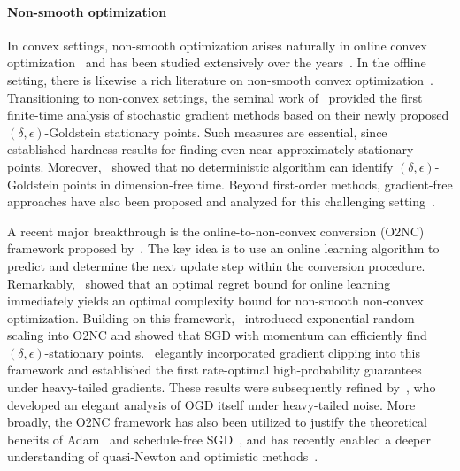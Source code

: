 \documentclass{article}
\begin{document}
\paragraph{Non-smooth optimization}
In convex settings, non-smooth optimization arises naturally in online convex optimization~\citep{zinkevich2003oco} and has been studied extensively over the years~\citep{hazan2019introduction,orabona2019intro}. In the offline setting, there is likewise a rich literature on non-smooth convex optimization~\citep{bubeck2015convex,hazan2019lecture}. Transitioning to non-convex settings, the seminal work of~\citet{zhang2020complexity} provided the first finite-time analysis of stochastic gradient methods based on their newly proposed $(\delta,\epsilon)$-Goldstein stationary points. Such measures are essential, since~\citet{kornowski2022oracle} established hardness results for finding even near approximately-stationary points. Moreover,~\citet{jordan2023deterministic} showed that no deterministic algorithm can identify $(\delta,\epsilon)$-Goldstein points in dimension-free time. Beyond first-order methods, gradient-free approaches have also been proposed and analyzed for this challenging setting~\citep{lin2022gradient,chen2023faster,liu2024zeroth,liu2024gradient}.

A recent major breakthrough is the online-to-non-convex conversion (O2NC) framework proposed by~\citet{cutkosky2023optimal}. The key idea is to use an online learning algorithm to predict and determine the next update step within the conversion procedure. Remarkably,~\citet{cutkosky2023optimal} showed that an optimal regret bound for online learning immediately yields an optimal complexity bound for non-smooth non-convex optimization. Building on this framework,~\citet{zhang2024random} introduced exponential random scaling into O2NC and showed that SGD with momentum can efficiently find $(\delta,\epsilon)$-stationary points.~\citet{ICML:2024:Liu} elegantly incorporated gradient clipping into this framework and established the first rate-optimal high-probability guarantees under heavy-tailed gradients. These results were subsequently refined by~\citet{liu2026old}, who developed an elegant analysis of OGD itself under heavy-tailed noise. More broadly, the O2NC framework has also been utilized to justify the theoretical benefits of Adam~\citep{ahn2024adam,ahn2024adamema} and schedule-free SGD~\citep{ahn2025general}, and has recently enabled a deeper understanding of quasi-Newton and optimistic methods~\citep{jiangSTOC2025improved,patitucci2026improving}.
\end{document}
